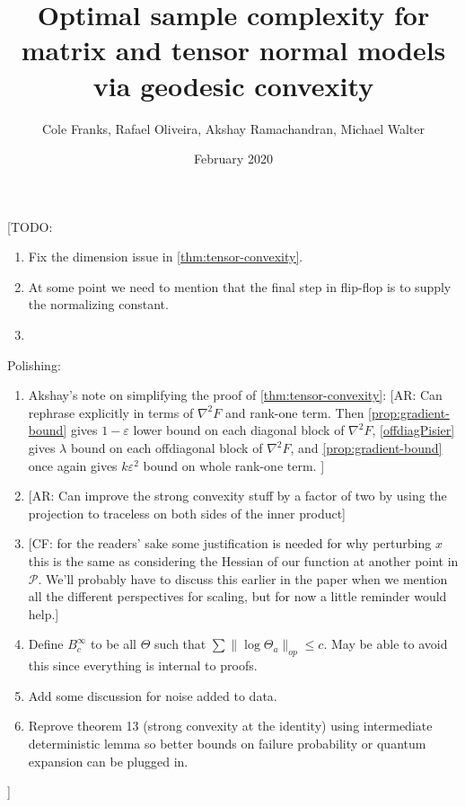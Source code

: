 \documentclass{article}
\title{Optimal sample complexity for matrix and tensor normal models via geodesic convexity}
\author{Cole Franks, Rafael Oliveira, Akshay Ramachandran, Michael Walter}
\date{February 2020}
\newcommand\eps{\varepsilon}
\newcommand\SPD{\mathcal{P}}
\newcommand\samp{x}
\newcommand{\CF}[1]{{\color{purple}[CF: #1]}}
\newcommand{\AR}[1]{{\color{orange}[AR: #1]}}
\newcommand{\TODO}[1]{{\color{blue}[TODO: #1]}}
\begin{document}
\maketitle
\tableofcontents
\TODO{
\begin{enumerate}
\item Fix the dimension issue in \cref{thm:tensor-convexity}.
\item At some point we need to mention that the final step in flip-flop is to supply the normalizing constant. 
\item 
\end{enumerate}
Polishing:
\begin{enumerate}
\item Akshay's note on simplifying the proof of \cref{thm:tensor-convexity}: \AR{Can rephrase explicitly in terms of $\nabla^{2} F$ and rank-one term. Then \cref{prop:gradient-bound} gives $1-\eps$ lower bound on each diagonal block of $\nabla^{2} F$, \cref{offdiagPisier} gives $\lambda$ bound on each offdiagonal block of $\nabla^{2} F$, and \cref{prop:gradient-bound} once again gives $k \eps^{2}$ bound on whole rank-one term.  }
\item \AR{Can improve the strong convexity stuff by a factor of two by using the projection to traceless on both sides of the inner product}
\item \CF{for the readers' sake some justification is needed for why perturbing $\samp$ this is the same as considering the Hessian of our function at another point in $\SPD$. We'll probably have to discuss this earlier in the paper when we mention all the different perspectives for scaling, but for now a little reminder would help.}
\item Define $B^\infty_c$ to be all $\Theta$ such that $\sum \|\log \Theta_a\|_{op} \leq c$. May be able to avoid this since everything is internal to proofs.
\item Add some discussion for noise added to data.
\item Reprove theorem 13 (strong convexity at the identity) using intermediate deterministic lemma so better bounds on failure probability or quantum expansion can be plugged in. 
\end{enumerate}

}
\end{document}
